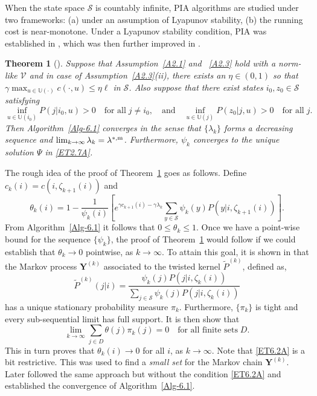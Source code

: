 \documentclass[notitlepage,11pt,reqno]{amsart}
\numberwithin{equation}{section}
\theoremstyle{plain}
\newtheorem{theorem}{Theorem}[section]
\theoremstyle{definition}
\theoremstyle{remark}
\newcommand{\Act}{{\mathds{U}}}
\newcommand{\cS}{{\mathcal{S}}}     %
\newcommand{\Lyap}{{\mathscr{V}}}   %
\newcommand{\lamstrdm}{\lambda^{*,{\rm m}}}
\begin{document}
When the state space $\cS$ is countably infinite, PIA algorithms are studied under two frameworks: (a) under an assumption of Lyapunov stability, (b) the running cost is near-monotone.
Under a Lyapunov stability condition, PIA was established in \cite{MR4429406}, which was then further improved in \cite{Wei-Chen}.
\begin{theorem}[\cite{MR4429406}]\label{T6.2}
Suppose that Assumption~\ref{A2.1} and ~\ref{A2.3} hold with a norm-like $\Lyap$ and in case of Assumption~\ref{A2.3}(ii), there exists an $\eta\in (0, 1)$ so that $\gamma\max_{u\in\Act(\cdot)}c(\cdot, u)\leq \eta\ell$ in $\cS$.
Also suppose that there exist states $i_0, z_0\in\cS$ satisfying
\begin{equation}\label{ET6.2A}
\inf_{u\in\Act(i_0)} P(j|i_0, u)>0\quad \text{for all}\; j\neq i_0, \quad \text{and}\quad \inf_{u\in\Act(j)} P(z_0|j, u)>0\quad \text{for all}\; j.
\end{equation}
Then Algorithm~\ref{Alg-6.1} converges in the sense that $\{\lambda_k\}$ forms a decreasing sequence and $\lim_{k\to\infty}\lambda_k=\lamstrdm$. Furthermore, 
$\psi_k$ converges to the unique solution $\Psi$ in \eqref{ET2.7A}.
\end{theorem}
The rough idea of the proof of Theorem~\ref{T6.2} goes as follows. Define $c_k(i)=c(i, \zeta_{k+1}(i))$ and
$$\theta_k(i)=1-\frac{1}{\psi_k(i)}\left[e^{\gamma c_{k+1}(i)-\gamma\lambda_k} \sum_{y\in\cS} \psi_k(y) P(y|i, \zeta_{k+1}(i))\right].$$
From Algorithm~\ref{Alg-6.1} it follows that $0\leq\theta_k\leq 1$. Once we have a point-wise bound for the sequence $\{\psi_k\}$, the proof of
Theorem~\ref{T6.2} would follow if we could establish that $\theta_k\to 0$ pointwise, as $k\to\infty$. To attain this goal, it is shown in 
\cite[Theorem~4.1]{MR4429406} that the Markov process $\textbf{Y}^{(k)}$ associated to the twisted kernel $\tilde{P}^{(k)}$, defined as,
$$\tilde{P}^{(k)}(j|i)=\frac{\psi_k(j) P(j|i, \zeta_k(i))}{\sum_{j\in\cS}\psi_k(j) P(j|i, \zeta_k(i))}$$
has a unique stationary probability measure $\pi_k$. Furthermore, $\{\pi_k\}$ is tight and every sub-sequential limit has full support. It is then
show that 
$$\lim_{k\to\infty} \sum_{j\in D} \theta(j) \pi_k(j)=0\quad \text{for all finite sets}\; D.$$
This in turn proves that $\theta_k(i)\to 0$ for all $i$, as $k\to\infty$.
Note that \eqref{ET6.2A} is a bit restrictive. This was used to find a {\it small set} for the Markov chain $\textbf{Y}^{(k)}$. Later \cite{Wei-Chen} followed the same approach 
but without the condition \eqref{ET6.2A} and established the convergence of Algorithm~\ref{Alg-6.1}.
\end{document}
